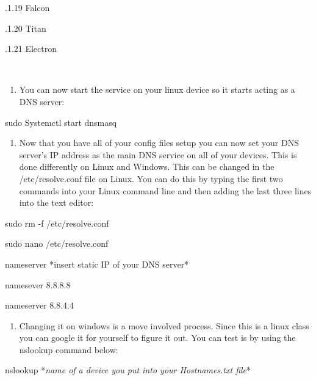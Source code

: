 \documentclass{article} %
\begin{document}
\noindent 

.1.19 Falcon

.1.20 Titan

.1.21 Electron

\noindent ~

\noindent 

\begin{enumerate}
\item  You can now start the service on your linux device so it starts acting as a DNS server:
\end{enumerate}

\noindent 

\noindent sudo Systemctl start dnsmasq

\noindent 

\noindent 

\begin{enumerate}
\item  Now that you have all of your config files setup you can now set your DNS server's IP address as the main DNS service on all of your devices. This is done differently on Linux and Windows. This can be changed in the /etc/resolve.conf file on Linux. You can do this by typing the first two commands into your Linux command line and then adding the last three lines into the text editor:
\end{enumerate}

\noindent 

\noindent sudo rm -f /etc/resolve.conf

\noindent 

\noindent sudo nano /etc/resolve.conf

\noindent 

\noindent nameserver *insert static IP of your DNS server*

\noindent namesever 8.8.8.8

\noindent nameserver 8.8.4.4

\noindent 

\begin{enumerate}
\item  Changing it on windows is a move involved process. Since this is a linux class you can google it for yourself to figure it out. You can test is by using the nslookup command below:
\end{enumerate}

\noindent 

\noindent nslookup *\textit{name of a device you put into your Hostnames.txt file}* 
\end{document}
